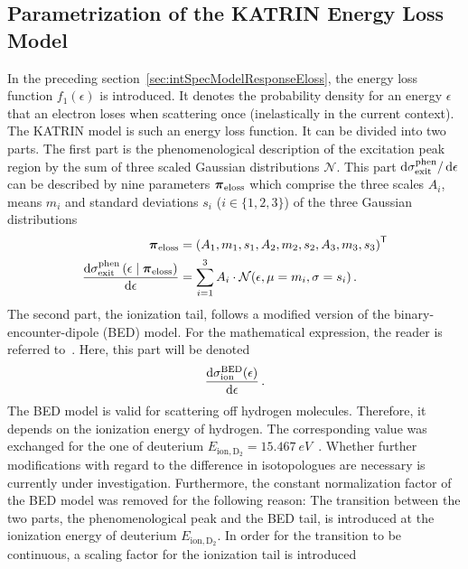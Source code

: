 \subsection{Parametrization of the KATRIN Energy Loss Model}
In the preceding section~\ref{sec:intSpecModelResponseEloss}, the energy loss function $f_1(\epsilon)$ is introduced. It denotes the probability density for an energy $\epsilon$ that an electron loses when scattering once (inelastically in the current context). The KATRIN model is such an energy loss function. It can be divided into two parts. The first part is the phenomenological description of the excitation peak region by the sum of three scaled Gaussian distributions $\mathcal{N}$. This part $\mathop{}\!\mathrm{d}\sigma_\mathrm{exit}^\mathrm{phen}/\mathop{}\!\mathrm{d} \epsilon$  can be described by nine parameters $\boldsymbol{\mathbf{\pi}}_\mathrm{eloss}$ which comprise the three scales $A_i$, means $m_i$ and standard deviations $s_i$ ($i \in \{1,2,3\}$) of the three Gaussian distributions~\cite{Hannen2019_2}
\newcommand{\katrinElossPhen}[1]{
	\frac{
		\d\sigma_\mathrm{exit}^\mathrm{phen}\giventhat*{#1}{\nuisanceParamVec_\mathrm{eloss}}
	}{
		\d \epsilon
	}
}
\begin{align}
\label{eq:katrinElossElossModelParams}
\nuisanceParamVec_\mathrm{eloss} &= 
\transp{\left(
	A_1, m_1, s_1, 
	A_2, m_2, s_2, 
	A_3, m_3, s_3
	\right)} \\
\katrinElossPhen{\epsilon} &=
\sum_{i=1}^3 A_i \cdot \mathcal{N}(\epsilon, \mu=m_i, \sigma=s_i)
\fullstop
\end{align}
The second part, the ionization tail, follows a modified version of the binary-encounter-dipole (BED) model. For the mathematical expression, the reader is referred to~\cite{Kim1994}. Here, this part will be denoted
\newcommand{\katrinElossBDE}[1]{
	\frac{
		\d \sigma_\mathrm{ion}^\mathrm{BED}(#1)
	}{
		\d \epsilon
	}
}%
\newcommand{\ionEnergyDeu}{E_\mathrm{ion,D_2}}%
\begin{equation}
	\katrinElossBDE{\epsilon}
	\fullstop
\end{equation}%
The BED model is valid for scattering off hydrogen molecules. Therefore, it depends on the ionization energy of hydrogen. The corresponding value was exchanged for the one of deuterium $\ionEnergyDeu=\SI{15.467}{eV}$~\cite{Shiner1993}. Whether further modifications with regard to the difference in isotopologues are necessary is currently under investigation. Furthermore, the constant normalization factor of the BED model was removed for the following reason: The transition between the two parts, the phenomenological peak and the BED tail, is introduced at the ionization energy of deuterium $\ionEnergyDeu$. In order for the transition to be continuous, a scaling factor for the ionization tail is introduced
